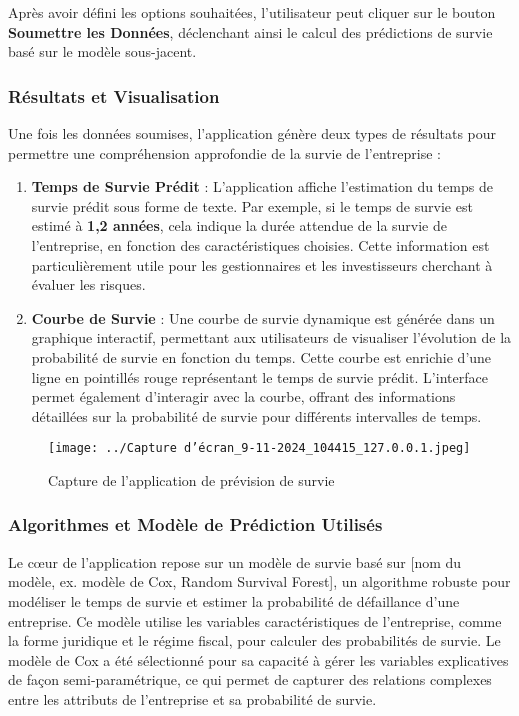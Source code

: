 \documentclass[a4paper,12pt]{report}
\begin{document}
Après avoir défini les options souhaitées, l'utilisateur peut cliquer sur le bouton \textbf{Soumettre les Données}, déclenchant ainsi le calcul des prédictions de survie basé sur le modèle sous-jacent.

\subsubsection{Résultats et Visualisation}

Une fois les données soumises, l'application génère deux types de résultats pour permettre une compréhension approfondie de la survie de l’entreprise :

\begin{enumerate}
    \item \textbf{Temps de Survie Prédit} : L'application affiche l'estimation du temps de survie prédit sous forme de texte. Par exemple, si le temps de survie est estimé à \textbf{1,2 années}, cela indique la durée attendue de la survie de l'entreprise, en fonction des caractéristiques choisies. Cette information est particulièrement utile pour les gestionnaires et les investisseurs cherchant à évaluer les risques.
    \item \textbf{Courbe de Survie} : Une courbe de survie dynamique est générée dans un graphique interactif, permettant aux utilisateurs de visualiser l'évolution de la probabilité de survie en fonction du temps. Cette courbe est enrichie d'une ligne en pointillés rouge représentant le temps de survie prédit. L'interface permet également d'interagir avec la courbe, offrant des informations détaillées sur la probabilité de survie pour différents intervalles de temps.
\end{enumerate}

\begin{figure}[H]
    \centering
    \texttt{[image: ../Capture d’écran\_9-11-2024\_104415\_127.0.0.1.jpeg]}
    \caption{Capture de l'application de prévision de survie}
\end{figure}

\subsubsection{Algorithmes et Modèle de Prédiction Utilisés}

Le cœur de l'application repose sur un modèle de survie basé sur [nom du modèle, ex. modèle de Cox, Random Survival Forest], un algorithme robuste pour modéliser le temps de survie et estimer la probabilité de défaillance d'une entreprise. Ce modèle utilise les variables caractéristiques de l’entreprise, comme la forme juridique et le régime fiscal, pour calculer des probabilités de survie. Le modèle de Cox a été sélectionné pour sa capacité à gérer les variables explicatives de façon semi-paramétrique, ce qui permet de capturer des relations complexes entre les attributs de l’entreprise et sa probabilité de survie.
\end{document}
